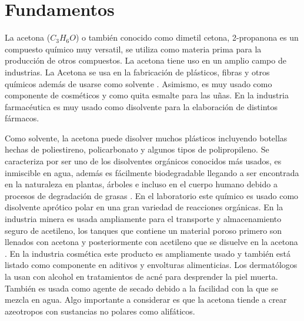 \section*{Fundamentos}
La acetona ($C_3H_6 O $)  o también conocido como dimetil cetona, 2-propanona es un compuesto químico  muy versatil, se utiliza como materia prima para la producción de otros compuestos. La acetona tiene uso en un amplio campo de industrias. La Acetona se usa en la fabricación de plásticos, fibras y otros químicos además de usarse  como solvente \cite{quiroz2014diseno}. Asimismo, es muy usado como componente de cosméticos y como quita esmalte para las uñas. En la industria farmacéutica es muy usado como disolvente para la elaboración de distintos fármacos.

Como solvente, la acetona puede disolver muchos plásticos incluyendo botellas hechas de poliestireno, policarbonato y algunos tipos de polipropileno. Se caracteriza por ser uno de los disolventes orgánicos conocidos más usados, es  inmiscible en agua, además es fácilmente biodegradable llegando a ser encontrada en la naturaleza en plantas, árboles e incluso en el cuerpo humano debido a procesos de degradación de grasas \cite{garcia2020ingenieria}. En el laboratorio este químico es usado como disolvente aprótico polar en una gran variedad de reacciones orgánicas. En la industria minera es usada ampliamente para el transporte y almacenamiento seguro de acetileno, los tanques que contiene un material poroso primero son llenados con acetona y posteriormente con acetileno que se disuelve en la acetona \cite{abdullah2017production}. En la industria cosmética este producto es ampliamente usado y también está listado como componente en aditivos y envolturas alimenticias. Los dermatólogos la usan con alcohol en tratamientos de acné para desprender la piel muerta. También es usada como agente de secado debido a la facilidad con la que se mezcla en agua. Algo importante a considerar  es que la acetona tiende a crear azeotropos  con sustancias no polares como alifáticos. \\

